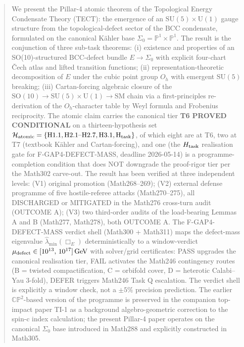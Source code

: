 \author{Jusang Lee}

\date{\today}

\begin{abstract}
We present the Pillar-4 atomic theorem of the Topological Energy
Condensate Theory (TECT): the emergence of an
$\mathrm{SU}(5) \times \mathrm{U}(1)$ gauge structure from the
topological-defect sector of the BCC condensate, formulated on the
canonical Kähler base $\Sigma_0 = \mathbb{P}^1 \times \mathbb{P}^1$.
The result is the conjunction of three sub-task theorems: (i)
existence and properties of an SO(10)-structured BCC-defect bundle
$E \to \Sigma_0$ with explicit four-chart \v{C}ech atlas and lifted
transition functions; (ii) representation-theoretic decomposition of
$E$ under the cubic point group $O_h$ with emergent $\mathrm{SU}(5)$
breaking; (iii) Cartan-forcing algebraic closure of the
$\mathrm{SO}(10) \to \mathrm{SU}(5) \times \mathrm{U}(1) \to
\mathrm{SM}$ chain via a first-principles re-derivation of the
$O_h$-character table by Weyl formula and Frobenius reciprocity.
The atomic claim carries the canonical tier
\textbf{T6 PROVED CONDITIONAL} on a thirteen-hypothesis set
$\mathcal{H}_{\rm atomic} = \{\mathrm{H1.1, H2.1\text{--}H2.7, H3.1,
H_{task}}\}$, of which eight are at T6, two at T7 (textbook K\"ahler
and Cartan-forcing), and one (the $H_{\rm task}$ realisation gate
for F-GAP4-DEFECT-MASS, deadline 2026-05-14) is a programme-completion
condition that does NOT downgrade the proof-rigor tier per the
Math302 carve-out. The result has been verified at three independent
levels: (V1) original promotion (Math268--269); (V2) external defense
programme of five hostile-referee attacks (Math270--275), all
DISCHARGED or MITIGATED in the Math276 cross-turn audit (OUTCOME A);
(V3) two third-order audits of the load-bearing Lemmas A and B
(Math277, Math278), both OUTCOME A. The F-GAP4-DEFECT-MASS verdict
shell (Math300 + Math311) maps the defect-mass eigenvalue
$\hat\lambda_{\min}(\Box_E)$ deterministically to a window-verdict
$\mu_{\rm defect} \in [10^{13},\,10^{17}]\,\mathrm{GeV}$ with
solver/grid certificates: PASS upgrades the canonical realisation
tier, FAIL activates the Math246 contingency routes (B = twisted
compactification, C = orbifold cover, D = heterotic Calabi--Yau
3-fold), DEFER triggers Math246 Task Q escalation. The verdict shell
is explicitly a window check, not a $\pm 5\%$ precision prediction.
The earlier $\mathbb{CP}^2$-based version of the programme is
preserved in the companion top-impact paper TI-1 as a background
algebro-geometric correction to the spin-c index calculation; the
present Pillar-4 paper operates on the canonical $\Sigma_0$ base
introduced in Math288 and explicitly constructed in Math305.
\end{abstract}

